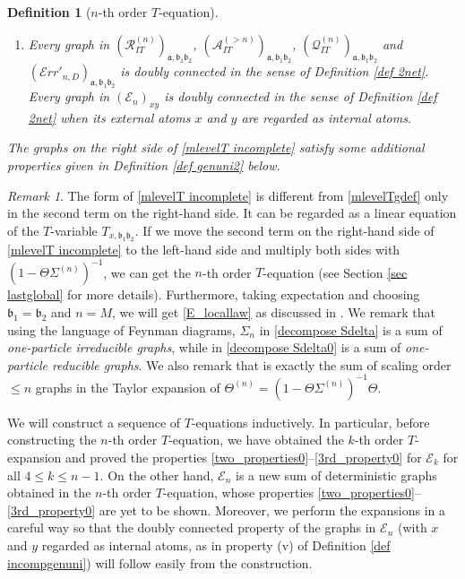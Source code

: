 \documentclass{article}
\newcommand{\1}{\mathds{1}}
\numberwithin{equation}{section}
\newcommand{\fa}{{\mathfrak a}}
\newcommand{\fb}{{\mathfrak b}}
\renewcommand{\leq}{\leqslant}
\renewcommand{\le}{\leq}
\theoremstyle{plain} %
\newtheorem{definition}[theorem]{Definition}
\theoremstyle{remark}
\newtheorem{remark}[theorem]{Remark}
\newcommand{\Sdelta}{{\Sigma}_T}
\newcommand{\wtSdelta}{\Sigma}
\newcommand{\wtSdeltan}{\Sigma^{(n)}}
\newcommand{\Sele}{{\mathcal E}}
\newcommand{\incomp}{{\text{$T$-equation}}}
\newcommand{\PITn}{{\mathcal R_{IT}^{(n)}}}
\newcommand{\QITn}{{\mathcal Q_{IT}^{(n)}}}
\newcommand{\AITn}{{\mathcal A_{IT}^{(>n)}}}
\newcommand{\Err}{{\mathcal Err}}
\begin{document}
\begin{definition} [$n$-th order $\incomp$]
\begin{enumerate}
		
		
		
		
		\item Every graph in $(\PITn)_{\fa,\fb_1\fb_2}$, $(\AITn)_{\fa,\fb_1\fb_2}$, $(\QITn)_{\fa,\fb_1\fb_2}$ and $(\Err'_{n,D})_{\fa,\fb_1\fb_2}$ is doubly connected in the sense of Definition \ref{def 2net}. Every graph in $(\Sele_n)_{xy}$ is doubly connected in the sense of Definition \ref{def 2net} when its external atoms $x$ and $y$ are regarded as internal atoms.
	\end{enumerate}
	The graphs on the right side of \eqref{mlevelT incomplete} satisfy some additional properties given in Definition  \ref{def genuni2} below.
\end{definition} 
\begin{remark}
The form of \eqref{mlevelT incomplete} is different from \eqref{mlevelTgdef} only in the second term on the right-hand side. It can be regarded as a linear equation of the $T$-variable $T_{x,\fb_1\fb_2}$. If we move the second term on the right-hand side of \eqref{mlevelT incomplete} to the left-hand side and multiply both sides with $(1-\Theta\wtSdeltan)^{-1}$, we can get the $n$-th order $T$-equation (see Section \ref{sec lastglobal} for more details). Furthermore, taking expectation and choosing $\fb_1=\fb_2$ and $n=M$, we will get \eqref{E_locallaw} as discussed in \cite{PartI_high}.  We remark that using the language of Feynman diagrams, $\wtSdelta_n$ in \eqref{decompose Sdelta} is a sum of \emph{one-particle irreducible graphs}, while \smash{$\Sdelta^{(n)}$} in \eqref{decompose Sdelta0} is a sum of \emph{one-particle reducible graphs}. We also remark that \smash{$\Theta\Sdelta^{(n)}\Theta$} is exactly the sum of scaling order $\le n$ graphs in the Taylor expansion of $\Theta^{(n)}=(1-\Theta\wtSdeltan)^{-1}\Theta$.

We will construct a sequence of $\incomp$s inductively. In particular, before constructing the $n$-th order $\incomp$, we have obtained the $k$-th order $T$-expansion and proved the properties \eqref{two_properties0}--\eqref{3rd_property0} for $\Sele_k$ for all $4\le k\le n-1$. On the other hand, $ \Sele_n$ is a new sum of deterministic graphs obtained in the $n$-th order $\incomp$, whose properties  \eqref{two_properties0}--\eqref{3rd_property0} are yet to be shown. Moreover, we perform the expansions in a careful way so that the doubly connected property of the graphs in $\Sele_n$ (with $x$ and $y$ regarded as internal atoms, as in property (v) of Definition \ref{def incompgenuni}) will follow easily from the construction.
\end{remark}
\end{document}
